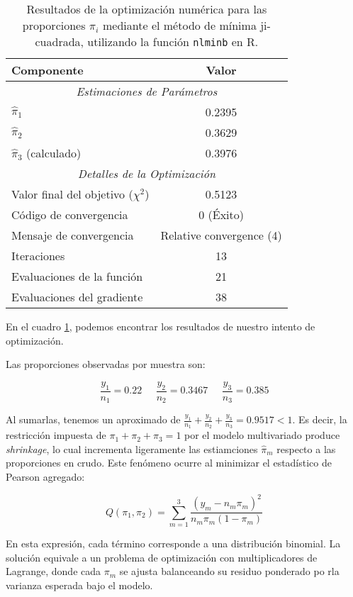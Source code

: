 \begin{table}[h!]
    \centering
    \caption{Resultados de la optimización numérica para las proporciones $\pi_i$ mediante el método de mínima ji-cuadrada, utilizando la función \texttt{nlminb} en R.}
    \label{tab:opt_results}
    \begin{tabular}{lc}
        \toprule
        \textbf{Componente} & \textbf{Valor} \\
        \midrule
        \multicolumn{2}{c}{\textit{Estimaciones de Parámetros}} \\
        $\hat{\pi}_1$ & 0.2395 \\
        $\hat{\pi}_2$ & 0.3629 \\
        $\hat{\pi}_3$ (calculado) & 0.3976 \\
        \midrule
        \multicolumn{2}{c}{\textit{Detalles de la Optimización}} \\
        Valor final del objetivo ($\chi^2$) & 0.5123 \\
        Código de convergencia & 0 (\'Exito) \\
        Mensaje de convergencia & Relative convergence (4) \\
        Iteraciones & 13 \\
        Evaluaciones de la función & 21 \\
        Evaluaciones del gradiente & 38 \\
        \bottomrule
    \end{tabular}
\end{table}

En el cuadro \ref{tab:opt_results}, podemos encontrar los resultados de nuestro intento de optimización. 

Las proporciones observadas por muestra son:

\[
    \frac{y_1}{n_1} = 0.22 \;\;\;\;\; \frac{y_2}{n_2} = 0.3467 \;\;\;\;\; \frac{y_3}{n_3} = 0.385
\]

Al sumarlas, tenemos un aproximado de $ \frac{y_1}{n_1} +  \frac{y_2}{n_2} +  \frac{y_3}{n_3} = 0.9517 < 1$. Es decir,
la restricción impuesta de $\pi_1 + \pi_2 + \pi_3 = 1$ por el modelo multivariado produce \textit{shrinkage}, 
lo cual incrementa ligeramente las estiamciones $\hat{\pi}_m$ respecto a las proporciones en crudo. Este
fenómeno ocurre al minimizar el estadístico de Pearson agregado:

\[
    Q(\pi_1, \pi_2) = \sum_{m=1}^{3} \frac{(y_m - n_m \pi_m)^2}{n_m \pi_m (1 - \pi_m)}
\]

En esta expresión, cada término corresponde a una distribución binomial. La solución equivale a un problema
de optimización con multiplicadores de Lagrange, donde cada $\pi_m$ se ajusta balanceando su
residuo ponderado po rla varianza esperada bajo el modelo. 

